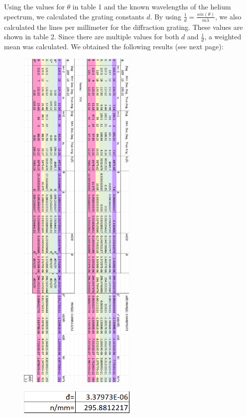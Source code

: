 \documentclass[a4paper]{article}
\begin{document}
Using the values for $\theta$ in table 1 and the known wavelengths of the helium spectrum, we calculated the grating constants $d$. By using $\frac{1}{d} = \frac{sin(\theta)}{m\lambda}$, we also calculated the lines per millimeter for the diffraction grating. These values are shown in table 2. Since there are multiple values for both $d$ and $\frac{1}{d}$, a weighted mean was calculated. We obtained the following results (see next page):
\begin{figure}[h]
\centering
\includegraphics[width=0.5\textwidth]{he1}
\end{figure}
\clearpage
\begin{figure}[h]
\centering
\includegraphics[width=0.5\textwidth]{he2}
\end{figure}
\end{document}
